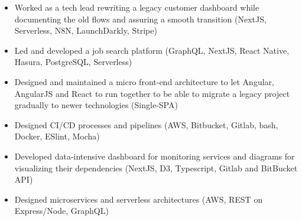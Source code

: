 \documentclass[10pt,a4paper,ragged2e,withhyper]{altacv}
\newcommand\faSkype{{\FA\symbol{"F17E}}}
\begin{document}

\begin{fullwidth}
\makecvheader
\end{fullwidth}



\begin{itemize}
\item Worked as a tech lead rewriting a legacy customer dashboard while documenting the old flows and assuring a smooth transition (NextJS, Serverless, N8N, LaunchDarkly, Stripe)
\item Led and developed a job search platform (GraphQL, NextJS, React Native, Hasura, PostgreSQL, Serverless)
\item Designed and maintained a micro front-end architecture to let Angular, AngularJS and React to run together to be able to migrate a legacy  project gradually to newer technologies (Single-SPA)
\item Designed CI/CD processes and pipelines (AWS, Bitbucket, Gitlab, bash, Docker, ESlint, Mocha)
\item Developed data-intensive dashboard for monitoring services and diagrams for visualizing their dependencies (NextJS, D3, Typescript, Gitlab and BitBucket API)
\item Designed microservices and serverless architectures (AWS, REST on Express/Node, GraphQL)
\end{itemize}
\end{document}
